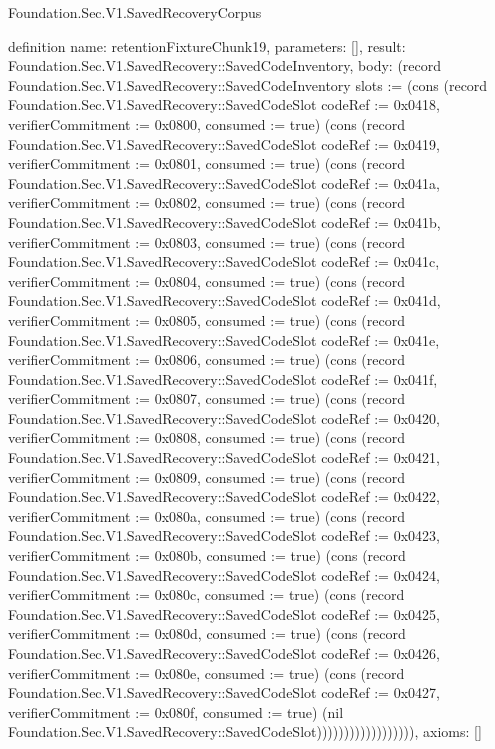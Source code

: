 \begin{lexlean}{Foundation.Sec.V1.SavedRecoveryCorpus}
\begin{semanticmodule}
definition{
  name: retentionFixtureChunk19,
  parameters: [],
  result: Foundation.Sec.V1.SavedRecovery::SavedCodeInventory,
  body: (record Foundation.Sec.V1.SavedRecovery::SavedCodeInventory {slots := (cons (record Foundation.Sec.V1.SavedRecovery::SavedCodeSlot {codeRef := 0x0418, verifierCommitment := 0x0800, consumed := true}) (cons (record Foundation.Sec.V1.SavedRecovery::SavedCodeSlot {codeRef := 0x0419, verifierCommitment := 0x0801, consumed := true}) (cons (record Foundation.Sec.V1.SavedRecovery::SavedCodeSlot {codeRef := 0x041a, verifierCommitment := 0x0802, consumed := true}) (cons (record Foundation.Sec.V1.SavedRecovery::SavedCodeSlot {codeRef := 0x041b, verifierCommitment := 0x0803, consumed := true}) (cons (record Foundation.Sec.V1.SavedRecovery::SavedCodeSlot {codeRef := 0x041c, verifierCommitment := 0x0804, consumed := true}) (cons (record Foundation.Sec.V1.SavedRecovery::SavedCodeSlot {codeRef := 0x041d, verifierCommitment := 0x0805, consumed := true}) (cons (record Foundation.Sec.V1.SavedRecovery::SavedCodeSlot {codeRef := 0x041e, verifierCommitment := 0x0806, consumed := true}) (cons (record Foundation.Sec.V1.SavedRecovery::SavedCodeSlot {codeRef := 0x041f, verifierCommitment := 0x0807, consumed := true}) (cons (record Foundation.Sec.V1.SavedRecovery::SavedCodeSlot {codeRef := 0x0420, verifierCommitment := 0x0808, consumed := true}) (cons (record Foundation.Sec.V1.SavedRecovery::SavedCodeSlot {codeRef := 0x0421, verifierCommitment := 0x0809, consumed := true}) (cons (record Foundation.Sec.V1.SavedRecovery::SavedCodeSlot {codeRef := 0x0422, verifierCommitment := 0x080a, consumed := true}) (cons (record Foundation.Sec.V1.SavedRecovery::SavedCodeSlot {codeRef := 0x0423, verifierCommitment := 0x080b, consumed := true}) (cons (record Foundation.Sec.V1.SavedRecovery::SavedCodeSlot {codeRef := 0x0424, verifierCommitment := 0x080c, consumed := true}) (cons (record Foundation.Sec.V1.SavedRecovery::SavedCodeSlot {codeRef := 0x0425, verifierCommitment := 0x080d, consumed := true}) (cons (record Foundation.Sec.V1.SavedRecovery::SavedCodeSlot {codeRef := 0x0426, verifierCommitment := 0x080e, consumed := true}) (cons (record Foundation.Sec.V1.SavedRecovery::SavedCodeSlot {codeRef := 0x0427, verifierCommitment := 0x080f, consumed := true}) (nil Foundation.Sec.V1.SavedRecovery::SavedCodeSlot)))))))))))))))))}),
  axioms: []
}


\end{semanticmodule}
\end{lexlean}
